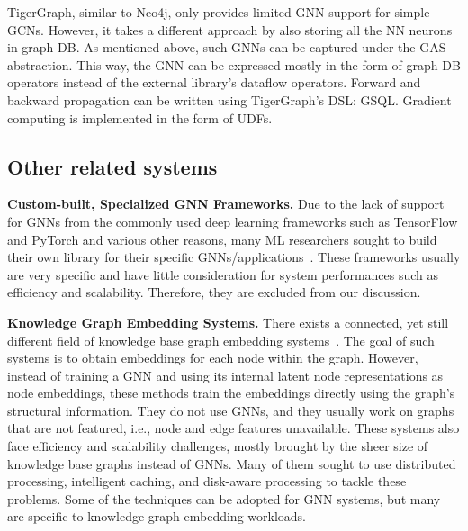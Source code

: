 TigerGraph, similar to Neo4j, only provides limited GNN support for simple GCNs. However, it takes a different approach by also storing all the NN neurons in graph DB. As mentioned above, such GNNs can be captured under the GAS abstraction. This way, the GNN can be expressed mostly in the form of graph DB operators instead of the external library's dataflow operators. Forward and backward propagation can be written using TigerGraph's DSL: GSQL. Gradient computing is implemented in the form of UDFs.


\subsection{Other related systems}

\vspace{2mm}
\noindent \textbf{Custom-built, Specialized GNN Frameworks.} Due to the lack of support for GNNs from the commonly used deep learning frameworks such as TensorFlow and PyTorch and various other reasons, many ML researchers sought to build their own library for their specific GNNs/applications~\cite{agl, graphsage}. These frameworks usually are very specific and have little consideration for system performances such as efficiency and scalability. Therefore, they are excluded from our discussion.


\vspace{2mm}
\noindent \textbf{Knowledge Graph Embedding Systems.} There exists a connected, yet still different field of knowledge base graph embedding systems~\cite{marius, dgl-ke, pbg, lightne}. The goal of such systems is to obtain embeddings for each node within the graph. However, instead of training a GNN and using its internal latent node representations as node embeddings, these methods train the embeddings directly using the graph's structural information. They do not use GNNs, and they usually work on graphs that are not featured, i.e., node and edge features unavailable. These systems also face efficiency and scalability challenges, mostly brought by the sheer size of knowledge base graphs instead of GNNs. Many of them sought to use distributed processing, intelligent caching, and disk-aware processing to tackle these problems. Some of the techniques can be adopted for GNN systems, but many are specific to knowledge graph embedding workloads.

